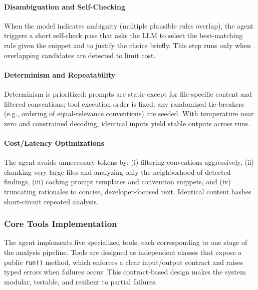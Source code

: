 \begin{spacing}{1.2}
\paragraph{Disambiguation and Self-Checking}
When the model indicates ambiguity (multiple plausible rules overlap), the agent triggers a short self-check pass that asks the LLM to select the best-matching rule given the snippet and to justify the choice briefly. This step runs only when overlapping candidates are detected to limit cost.

\paragraph{Determinism and Repeatability}
Determinism is prioritized: prompts are static except for file-specific content and filtered conventions; tool execution order is fixed; any randomized tie-breakers (e.g., ordering of equal-relevance conventions) are seeded. With temperature near zero and constrained decoding, identical inputs yield stable outputs across runs.

\paragraph{Cost/Latency Optimizations}
The agent avoids unnecessary tokens by: (i) filtering conventions aggressively, (ii) chunking very large files and analyzing only the neighborhood of detected findings, (iii) caching prompt templates and convention snippets, and (iv) truncating rationales to concise, developer-focused text. Identical content hashes short-circuit repeated analysis.


\subsubsection{Core Tools Implementation}
The agent implements five specialized tools, each corresponding to one stage of the analysis pipeline. Tools are designed as independent classes that expose a public \texttt{run()} method, which enforces a clear input/output contract and raises typed errors when failures occur. This contract-based design makes the system modular, testable, and resilient to partial failures.


\end{spacing}
